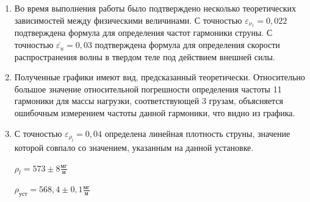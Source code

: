 \documentclass[12pt,a4paper]{article}
\begin{document}
\begin{enumerate}
	\item Во время выполнения работы было подтверждено несколько теоретических зависимостей между физическими величинами. С точностью $\varepsilon_{\nu_{1}} = 0,022$ подтверждена формула для определения частот гармоники струны. С точностью  $\overline{\varepsilon_{u}} = 0,03$ подтверждена формула для определения скорости распространения волны в твердом теле под действием внешней силы.
	\item Полученные графики имеют вид, предсказанный теоретически. Относительно большое значение относительной погрешности определения частоты 11 гармоники для массы нагрузки, соответствующей 3 грузам, объясняется ошибочным измерением частоты данной гармоники, что видно из графика. 
	\item С точностью $ \varepsilon_{\rho_{l}} = 0,04$ определена линейная плотность струны, значение которой совпало со значением, указанным на данной установке.
	
	$\rho_{l} = 573 \pm 8 \frac{\text{мг}}{\text{м}}$
	
	$\rho_{\text{уст}} = 568,4 \pm 0,1 \frac{\text{мг}}{\text{м}}$

\end{enumerate}
\end{document}
